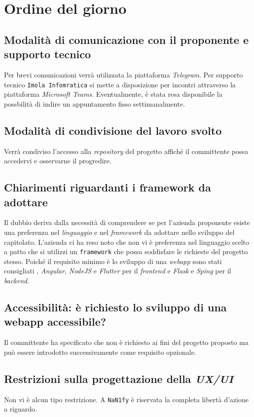 \section{Ordine del giorno}
\subsection{Modalità di comunicazione con il proponente e supporto tecnico}
    Per brevi comunicazioni verrà utilizzata la piattaforma \textit{Telegram}. Per supporto tecnico \texttt{Imola Infomratica} si mette a disposizione per incontri attraverso la piattaforma \textit{Microsoft Teams}. Eventualmente, è stata resa disponibile la possbilità di indire un appuntamento fisso settimanalmente.
\subsection{Modalità di condivisione del lavoro svolto}
    Verrà condiviso l'accesso alla \textit{repository} del progetto affiché il committente possa accedervi e osservarne il progredire. 
\subsection{Chiarimenti riguardanti i framework da adottare}
    Il dubbio deriva dalla necessità di comprendere se per l'azienda proponente esiste una preferenza nel \textit{linguaggio} e nel \textit{framework} da adottare nello sviluppo del capitolato. L'azienda ci ha reso noto che non vi è preferenza nel linguaggio scelto a patto che si utilizzi un \texttt{framework} che possa soddisfare le richieste del progetto stesso. Poiché il requisito minimo è lo sviluppo di una \textit{webapp} sono stati consigliati , \textit{Angular}, \textit{NodeJS} e \textit{Flutter} per il \textit{frontend} e \textit{Flask} e \textit{Sping} per il \textit{backend}.
\subsection{Accessibilità: è richiesto lo sviluppo di una webapp accessibile?}
    Il committente ha specificato che non è richiesto ai fini del progetto proposto ma può essere introdotto successivamente come requisito opzionale.
\subsection{Restrizioni sulla progettazione della \textit{UX/UI}}
    Non vi è alcun tipo restrizione. A \texttt{NaN1fy} è riservata la completa libertà d'azione a riguardo.
